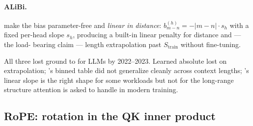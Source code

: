 \paragraph{ALiBi.} \citet[ALiBi]{press-alibi} make the bias
parameter-free and \emph{linear in distance}:
$b_{m-n}^{(h)} = -|m-n| \cdot s_h$ with a fixed per-head slope $s_h$,
producing a built-in linear penalty for distance and --- the load-
bearing claim --- length extrapolation past $S_{\text{train}}$ without
fine-tuning.

All three lost ground to  for  LLMs by 2022--2023.
Learned absolute lost on extrapolation; 's binned table did not
generalize cleanly across context lengths; 's linear slope is the
right shape for some workloads but not for the long-range structure
attention is asked to handle in modern  training.

\subsection{RoPE: rotation in the QK inner product}
\label{sec:pos-rope}

